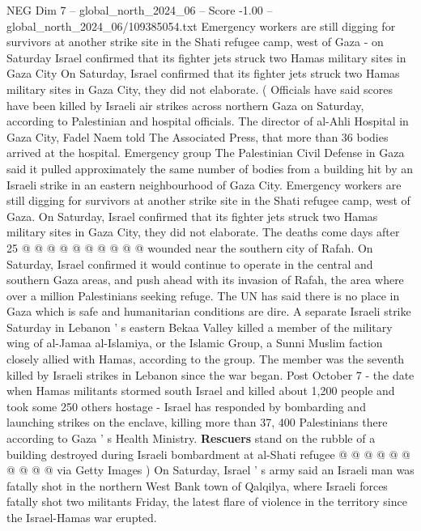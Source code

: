 \begin{textsample}{NEG Dim 7 – global\_north\_2024\_06 – Score -1.00 – global\_north\_2024\_06/109385054.txt}  \label{ex:f7_neg_367}
Emergency workers are still digging for survivors at another strike site in the Shati refugee camp, west of Gaza - on Saturday Israel confirmed that its fighter jets struck two Hamas military sites in Gaza City On Saturday, Israel confirmed that its fighter jets struck two Hamas military sites in Gaza City, they did not elaborate. ( Officials have said scores have been killed by Israeli air strikes across northern Gaza on Saturday, according to Palestinian and hospital officials.
The director of al-Ahli Hospital in Gaza City, Fadel Naem told The Associated Press, that more than 36 bodies arrived at the hospital.
Emergency group The Palestinian Civil Defense in Gaza said it pulled approximately the same number of bodies from a building hit by an Israeli strike in an eastern neighbourhood of Gaza City.
Emergency workers are still digging for survivors at another strike site in the Shati refugee camp, west of Gaza.
On Saturday, Israel confirmed that its fighter jets struck two Hamas military sites in Gaza City, they did not elaborate.
The deaths come days after 25 @ @ @ @ @ @ @ @ @ @ wounded near the southern city of Rafah.
On Saturday, Israel confirmed it would continue to operate in the central and southern Gaza areas, and push ahead with its invasion of Rafah, the area where over a million Palestinians seeking refuge.
The UN has said there is no place in Gaza which is safe and humanitarian conditions are dire.
A separate Israeli strike Saturday in Lebanon ' s eastern Bekaa Valley killed a member of the military wing of al-Jamaa al-Islamiya, or the Islamic Group, a Sunni Muslim faction closely allied with Hamas, according to the group.
The member was the seventh killed by Israeli strikes in Lebanon since the war began.
Post October 7 - the date when Hamas militants stormed south Israel and killed about 1,200 people and took some 250 others hostage - Israel has responded by bombarding and launching strikes on the enclave, killing more than 37, 400 Palestinians there according to Gaza ' s Health Ministry. \textbf{Rescuers} stand on the rubble of a building destroyed during Israeli bombardment at al-Shati refugee @ @ @ @ @ @ @ @ @ @ via Getty Images ) On Saturday, Israel ' s army said an Israeli man was fatally shot in the northern West Bank town of Qalqilya, where Israeli forces fatally shot two militants Friday, the latest flare of violence in the territory since the Israel-Hamas war erupted.

\end{textsample}
